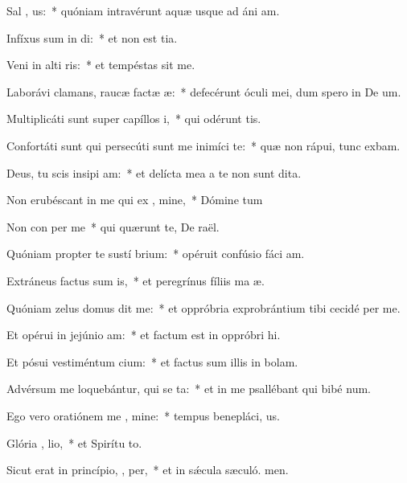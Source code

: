 \item Sal  , us:~* quóniam intravérunt aquæ usque ad áni am.
\item Infíxus sum in  di:~* et non est tia.
\item Veni in alti ris:~* et tempéstas sit me.
\item Laborávi clamans, raucæ factæ   æ:~* defecérunt óculi mei, dum spero in De um.
\item Multiplicáti sunt super capíllos  i,~* qui odérunt  tis.
\item Confortáti sunt qui persecúti sunt me inimíci  te:~* quæ non rápui, tunc exbam.
\item Deus, tu scis insipi am:~* et delícta mea a te non sunt dita.
\item Non erubéscant in me qui ex , mine,~* Dómine tum
\item Non con per me~* qui quærunt te, De raël.
\item Quóniam propter te sustí brium:~* opéruit confúsio fáci am.
\item Extráneus factus sum  is,~* et peregrínus fíliis ma æ.
\item Quóniam zelus domus  dit me:~* et oppróbria exprobrántium tibi cecidé per me.
\item Et opérui in jejúnio  am:~* et factum est in oppróbri hi.
\item Et pósui vestiméntum  cium:~* et factus sum illis in bolam.
\item Advérsum me loquebántur, qui se  ta:~* et in me psallébant qui bibé num.
\item Ego vero oratiónem me  , mine:~* tempus benepláci, us.
\item Glória ,  lio,~* et Spirítu to.
\item Sicut erat in princípio,  ,  per,~* et in sǽcula sæculó. men.
